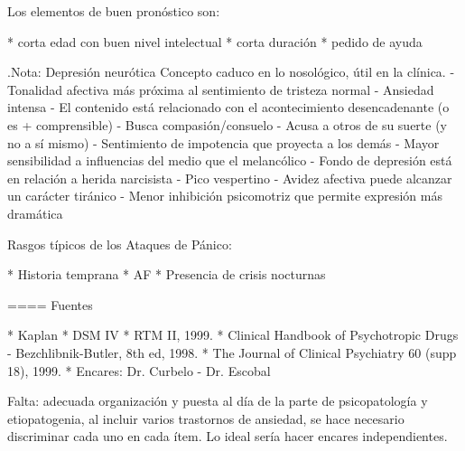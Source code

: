 Los elementos de buen pronóstico son:

* corta edad con buen nivel intelectual
* corta duración
* pedido de ayuda


.Nota: Depresión neurótica
Concepto caduco en lo nosológico, útil en la clínica.
- Tonalidad afectiva más próxima al sentimiento de tristeza normal
- Ansiedad intensa
- El contenido está relacionado con el acontecimiento desencadenante (o es + comprensible)
- Busca compasión/consuelo
- Acusa a otros de su suerte (y no a sí mismo)
- Sentimiento de impotencia que proyecta a los demás
- Mayor sensibilidad a influencias del medio que el melancólico
- Fondo de depresión está en relación a herida narcisista
- Pico vespertino
- Avidez afectiva puede alcanzar un carácter tiránico
- Menor inhibición psicomotriz que permite expresión más dramática

Rasgos típicos de los Ataques de Pánico:

* Historia temprana
* AF
* Presencia de crisis nocturnas

==== Fuentes

* Kaplan
* DSM IV
* RTM II, 1999.
* Clinical Handbook of Psychotropic Drugs - Bezchlibnik-Butler, 8th ed, 1998.
* The Journal of Clinical Psychiatry 60 (supp 18), 1999.
* Encares: Dr. Curbelo - Dr. Escobal

Falta: adecuada organización y puesta al día de la parte de psicopatología y etiopatogenia, al incluir varios trastornos de ansiedad, se hace necesario discriminar cada uno en cada ítem. Lo ideal sería hacer encares independientes.
